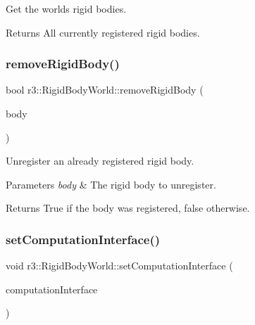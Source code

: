 Get the world\textquotesingle{}s rigid bodies. 

\begin{DoxyReturn}{Returns}
All currently registered rigid bodies. 
\end{DoxyReturn}
\mbox{\label{classr3_1_1_rigid_body_world_a916edefa8befc0401b6f757037139931}} 
\subsubsection{\texorpdfstring{remove\+Rigid\+Body()}{removeRigidBody()}}
{\footnotesize\ttfamily bool r3\+::\+Rigid\+Body\+World\+::remove\+Rigid\+Body (\begin{DoxyParamCaption}\item[{\mbox{\hyperlink{classr3_1_1_rigid_body}{Rigid\+Body}} $\ast$}]{body }\end{DoxyParamCaption})}



Unregister an already registered rigid body. 


\begin{DoxyParams}{Parameters}
{\em body} & The rigid body to unregister. \\
\hline
\end{DoxyParams}
\begin{DoxyReturn}{Returns}
True if the body was registered, false otherwise. 
\end{DoxyReturn}
\mbox{\label{classr3_1_1_rigid_body_world_a0c5724007917231ebe9bd970d65b0bfe}} 
\subsubsection{\texorpdfstring{set\+Computation\+Interface()}{setComputationInterface()}}
{\footnotesize\ttfamily void r3\+::\+Rigid\+Body\+World\+::set\+Computation\+Interface (\begin{DoxyParamCaption}\item[{\mbox{\hyperlink{classr3_1_1_rigid_body_engine_c_i}{Rigid\+Body\+Engine\+CI}} $\ast$}]{computation\+Interface }\end{DoxyParamCaption})}



